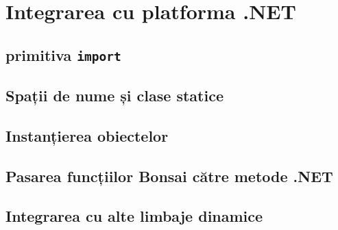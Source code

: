 \documentclass[12pt,a4paper]{memoir}
\begin{document}
\chapter{Integrarea cu platforma .NET}

\section{primitiva \texttt{import}}

\section{Spații de nume și clase statice}

\section{Instanțierea obiectelor}

\section{Pasarea funcțiilor Bonsai către metode .NET}

\section{Integrarea cu alte limbaje dinamice}

{}

\end{document}

